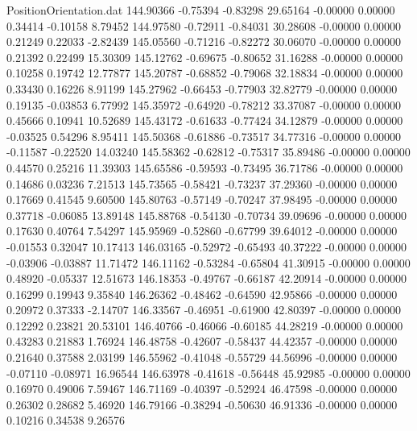 \begin{filecontents}{PositionOrientation.dat}
 144.90366   -0.75394   -0.83298    29.65164   -0.00000    0.00000    0.34414   -0.10158    8.79452
 144.97580   -0.72911   -0.84031    30.28608   -0.00000    0.00000    0.21249    0.22033   -2.82439
 145.05560   -0.71216   -0.82272    30.06070   -0.00000    0.00000    0.21392    0.22499   15.30309
 145.12762   -0.69675   -0.80652    31.16288   -0.00000    0.00000    0.10258    0.19742   12.77877
 145.20787   -0.68852   -0.79068    32.18834   -0.00000    0.00000    0.33430    0.16226    8.91199
 145.27962   -0.66453   -0.77903    32.82779   -0.00000    0.00000    0.19135   -0.03853    6.77992
 145.35972   -0.64920   -0.78212    33.37087   -0.00000    0.00000    0.45666    0.10941   10.52689
 145.43172   -0.61633   -0.77424    34.12879   -0.00000    0.00000   -0.03525    0.54296    8.95411
 145.50368   -0.61886   -0.73517    34.77316   -0.00000    0.00000   -0.11587   -0.22520   14.03240
 145.58362   -0.62812   -0.75317    35.89486   -0.00000    0.00000    0.44570    0.25216   11.39303
 145.65586   -0.59593   -0.73495    36.71786   -0.00000    0.00000    0.14686    0.03236    7.21513
 145.73565   -0.58421   -0.73237    37.29360   -0.00000    0.00000    0.17669    0.41545    9.60500
 145.80763   -0.57149   -0.70247    37.98495   -0.00000    0.00000    0.37718   -0.06085   13.89148
 145.88768   -0.54130   -0.70734    39.09696   -0.00000    0.00000    0.17630    0.40764    7.54297
 145.95969   -0.52860   -0.67799    39.64012   -0.00000    0.00000   -0.01553    0.32047   10.17413
 146.03165   -0.52972   -0.65493    40.37222   -0.00000    0.00000   -0.03906   -0.03887   11.71472
 146.11162   -0.53284   -0.65804    41.30915   -0.00000    0.00000    0.48920   -0.05337   12.51673
 146.18353   -0.49767   -0.66187    42.20914   -0.00000    0.00000    0.16299    0.19943    9.35840
 146.26362   -0.48462   -0.64590    42.95866   -0.00000    0.00000    0.20972    0.37333   -2.14707
 146.33567   -0.46951   -0.61900    42.80397   -0.00000    0.00000    0.12292    0.23821   20.53101
 146.40766   -0.46066   -0.60185    44.28219   -0.00000    0.00000    0.43283    0.21883    1.76924
 146.48758   -0.42607   -0.58437    44.42357   -0.00000    0.00000    0.21640    0.37588    2.03199
 146.55962   -0.41048   -0.55729    44.56996   -0.00000    0.00000   -0.07110   -0.08971   16.96544
 146.63978   -0.41618   -0.56448    45.92985   -0.00000    0.00000    0.16970    0.49006    7.59467
 146.71169   -0.40397   -0.52924    46.47598   -0.00000    0.00000    0.26302    0.28682    5.46920
 146.79166   -0.38294   -0.50630    46.91336   -0.00000    0.00000    0.10216    0.34538    9.26576

\end{filecontents}
